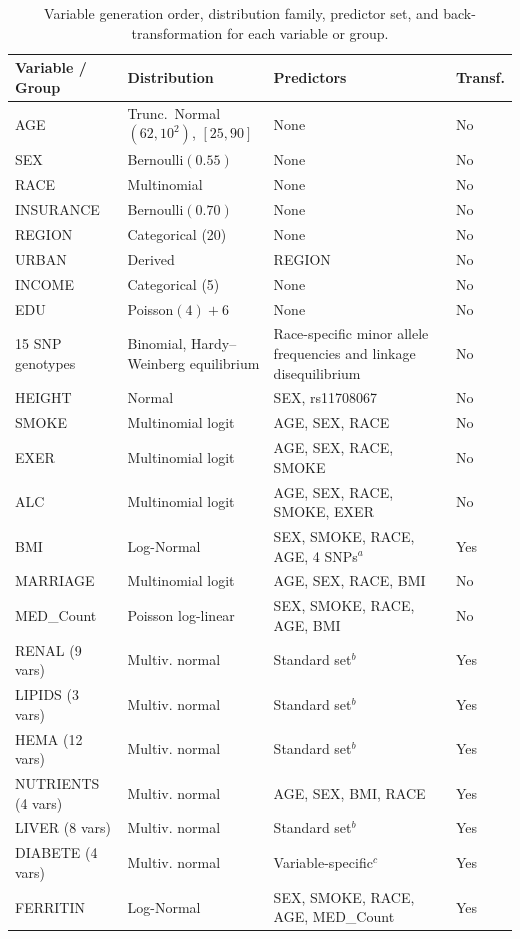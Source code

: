 \begin{table}[ht]
\centering
\caption{Variable generation order, distribution family, predictor set, and back-transformation for each variable or group.}
\label{tab:app_sim2_overview}
\small
\begin{tabular}{p{3.2cm}p{3.2cm}p{4.9cm}p{1.5cm}}
\hline
\textbf{Variable / Group} & \textbf{Distribution} &
\textbf{Predictors} & \textbf{Transf.} \\
\hline
AGE & Trunc.\ Normal$(62,10^2)$, $[25,90]$ & None & No \\
SEX & Bernoulli$(0.55)$ & None & No \\
RACE & Multinomial & None & No \\
INSURANCE & Bernoulli$(0.70)$ & None & No \\
REGION & Categorical (20) & None & No \\
URBAN & Derived & REGION & No \\
INCOME & Categorical (5) & None & No \\
EDU & Poisson$(4)+6$ & None & No \\
15 SNP genotypes & Binomial, Hardy--Weinberg equilibrium & Race-specific minor allele frequencies and linkage disequilibrium & No \\
HEIGHT & Normal & SEX, rs11708067 & No \\
SMOKE & Multinomial logit & AGE, SEX, RACE & No \\
EXER & Multinomial logit & AGE, SEX, RACE, SMOKE & No \\
ALC & Multinomial logit & AGE, SEX, RACE, SMOKE, EXER & No \\
BMI & Log-Normal & SEX, SMOKE, RACE, AGE, 4 SNPs$^a$ & Yes \\
MARRIAGE & Multinomial logit & AGE, SEX, RACE, BMI & No \\
MED\_Count & Poisson log-linear & SEX, SMOKE, RACE, AGE, BMI & No \\
RENAL (9 vars) & Multiv. normal & Standard set$^b$ & Yes \\
LIPIDS (3 vars) & Multiv. normal & Standard set$^b$ & Yes \\
HEMA (12 vars) & Multiv. normal & Standard set$^b$ & Yes \\
NUTRIENTS (4 vars) & Multiv. normal & AGE, SEX, BMI, RACE & Yes \\
LIVER (8 vars) & Multiv. normal & Standard set$^b$ & Yes \\
DIABETE (4 vars) & Multiv. normal & Variable-specific$^c$ & Yes \\
FERRITIN & Log-Normal & SEX, SMOKE, RACE, AGE, MED\_Count & Yes \\

\end{tabular}
\end{table}
